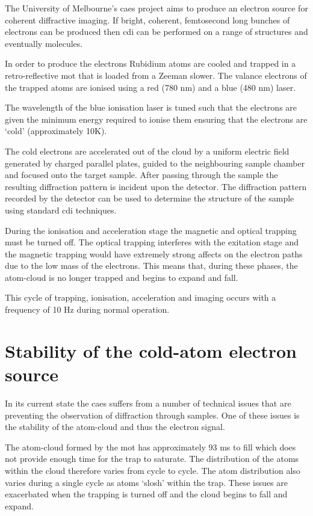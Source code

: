 The University of Melbourne's \gls{caes} project aims to produce an electron source for coherent diffractive imaging. If bright, coherent, femtosecond long bunches of electrons can be produced then \gls{cdi} can be performed on a range of structures and eventually molecules.

In order to produce the electrons Rubidium atoms are cooled and trapped in a retro-reflective \gls{mot} that is loaded from a Zeeman slower\cite{phillips_laser_1982, phillips_cooling_1987, bell_slow_2010}. The valance electrons of the trapped atoms are ionised using a red (780 nm) and a blue (480 nm) laser.

The wavelength of the blue ionisation laser is tuned such that the electrons are given the minimum energy required to ionise them ensuring that the electrons are `cold' (approximately 10K\cite{mcculloch_arbitrarily_2011}).

The cold electrons are accelerated out of the cloud by a uniform electric field generated by charged parallel plates, guided to the neighbouring sample chamber and focused onto the target sample. After passing through the sample the resulting diffraction pattern is incident upon the detector. The diffraction pattern recorded by the detector can be used to determine the structure of the sample using standard \gls{cdi} techniques.

During the ionisation and acceleration stage the magnetic and optical trapping must be turned off. The optical trapping interferes with the exitation stage and the magnetic trapping would have extremely strong affects on the electron paths due to the low mass of the electrons. This means that, during these phases, the atom-cloud is no longer trapped and begins to expand and fall.

This cycle of trapping, ionisation, acceleration and imaging occurs with a frequency of 10 Hz during normal operation.

\section{Stability of the cold-atom electron source}

In its current state the \gls{caes} suffers from a number of technical issues that are preventing the observation of diffraction through samples. One of these issues is the stability of the atom-cloud and thus the electron signal.

The atom-cloud formed by the \gls{mot} has approximately 93 ms to fill which does not provide enough time for the trap to saturate. The distribution of the atoms within the cloud therefore varies from cycle to cycle. The atom distribution also varies during a single cycle as atoms `slosh' within the trap. These issues are exacerbated when the trapping is turned off and the cloud begins to fall and expand.

